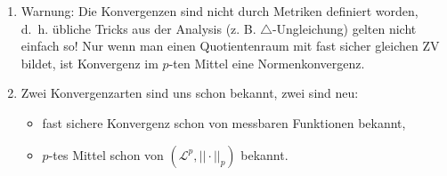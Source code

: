 \begin{bem}\abs
	\begin{enumerate}[label=(\roman*)]
		\item Warnung: Die Konvergenzen sind nicht durch Metriken definiert worden, \mbox{d. h.} \"ubliche Tricks aus der Analysis (z. B. $\triangle$-Ungleichung) gelten nicht einfach so! Nur wenn man einen Quotientenraum mit fast sicher gleichen ZV bildet, ist Konvergenz im $p$-ten Mittel eine Normenkonvergenz.
		\item Zwei Konvergenzarten sind uns schon bekannt, zwei sind neu:
		\begin{itemize}
			\item fast sichere Konvergenz schon von messbaren Funktionen bekannt,
			\item $p$-tes Mittel schon von $(\mathcal L^p, ||\cdot||_p)$ bekannt.
		\end{itemize}
	\end{enumerate}
\end{bem}

